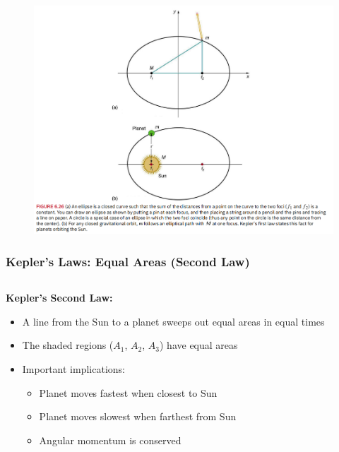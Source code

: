 \documentclass{beamer}
\begin{document}
\begin{frame}
\begin{figure}
    \centering
    \includegraphics[width=1\linewidth]{kepfirst.png}
\end{figure}
\end{frame}

\begin{frame}
\frametitle{Kepler's Laws: Equal Areas (Second Law)}
\begin{columns}
\begin{column}{0.6\textwidth}
\textbf{Kepler's Second Law:}
\begin{itemize}
    \item A line from the Sun to a planet sweeps out equal areas in equal times
    \item The shaded regions ($A_1$, $A_2$, $A_3$) have equal areas
    \item Important implications:
    \begin{itemize}
        \item Planet moves fastest when closest to Sun
        \item Planet moves slowest when farthest from Sun
        \item Angular momentum is conserved
    \end{itemize}
\end{itemize}
\end{column}
\begin{column}{0.4\textwidth}

\end{column}
\end{columns}
\end{frame}
\end{document}
